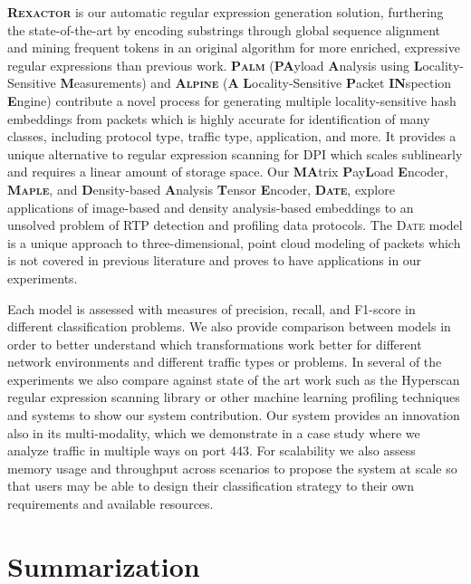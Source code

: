 \textbf{\textsc{Rexactor}} is our automatic regular expression generation solution, furthering the state-of-the-art by encoding substrings through global sequence alignment and mining frequent tokens in an original algorithm for more enriched, expressive regular expressions than previous work. \textbf{\textsc{Palm}} (\textbf{PA}yload \textbf{A}nalysis using \textbf{L}ocality-Sensitive \textbf{M}easurements) and \textbf{\textsc{Alpine}} (\textbf{A} \textbf{L}ocality-Sensitive \textbf{P}acket \textbf{IN}spection \textbf{E}ngine) contribute a novel process for generating multiple locality-sensitive hash embeddings from packets which is highly accurate for identification of many classes, including protocol type, traffic type, application, and more. It provides a unique alternative to regular expression scanning for DPI which scales sublinearly and requires a linear amount of storage space. Our \textbf{MA}trix \textbf{P}ay\textbf{L}oad \textbf{E}ncoder, \textbf{\textsc{Maple}}, and \textbf{D}ensity-based \textbf{A}nalysis \textbf{T}ensor \textbf{E}ncoder, \textbf{\textsc{Date}}, explore applications of image-based and density analysis-based embeddings to an unsolved problem of RTP detection and profiling data protocols. The \textsc{Date} model is a unique approach to three-dimensional, point cloud modeling of packets which is not covered in previous literature and proves to have applications in our experiments.

Each model is assessed with measures of precision, recall, and F1-score in different classification problems. We also provide comparison between models in order to better understand which transformations work better for different network environments and different traffic types or problems. In several of the experiments we also compare against state of the art work such as the Hyperscan regular expression scanning library or other machine learning profiling techniques and systems to show our system contribution. Our system provides an innovation also in its multi-modality, which we demonstrate in a case study where we analyze traffic in multiple ways on port 443. For scalability we also assess memory usage and throughput across scenarios to propose the system at scale so that users may be able to design their classification strategy to their own requirements and available resources.

\section{Summarization}

